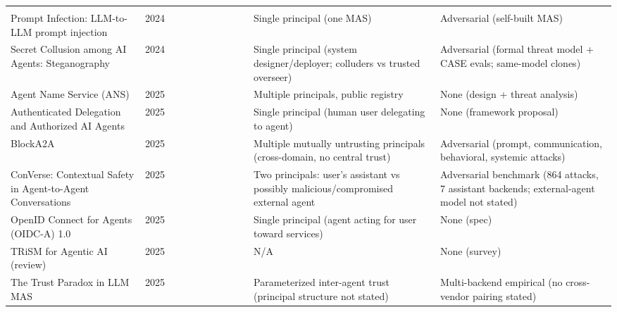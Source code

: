 \documentclass[conference]{IEEEtran}
\newcommand{\full}{{\small\CIRCLE}}
\newcommand{\half}{{\small\LEFTcircle}}
\newcommand{\none}{{\small\Circle}}
\begin{document}
{\begin{longtable}{>{\raggedright\arraybackslash}p{4.2cm} c cccccccc >{\raggedright\arraybackslash}p{3.6cm} >{\raggedright\arraybackslash}p{4.4cm}}
\multicolumn{12}{l}{\textit{Security/identity/delegation}} \\
Prompt Infection: LLM-to-LLM prompt injection \cite{lee2024prompt} & 2024 & \none{} & \none{} & \none{} & \none{} & \none{} & \none{} & \none{} & \full{} & Single principal (one MAS) & Adversarial (self-built MAS) \\
Secret Collusion among AI Agents: Steganography \cite{motwani2024collusion} & 2024 & \none{} & \none{} & \none{} & \none{} & \none{} & \half{} & \none{} & \full{} & Single principal (system designer/deployer; colluders vs trusted overseer) & Adversarial (formal threat model + CASE evals; same-model clones) \\
Agent Name Service (ANS) \cite{huang2025ans} & 2025 & \half{} & \half{} & \none{} & \none{} & \none{} & \none{} & \none{} & \half{} & Multiple principals, public registry & None (design + threat analysis) \\
Authenticated Delegation and Authorized AI Agents \cite{south2025authenticated} & 2025 & \none{} & \none{} & \none{} & \half{} & \none{} & \none{} & \half{} & \none{} & Single principal (human user delegating to agent) & None (framework proposal) \\
BlockA2A \cite{zou2025blocka2a} & 2025 & \none{} & \half{} & \none{} & \half{} & \none{} & \none{} & \full{} & \full{} & Multiple mutually untrusting principals (cross-domain, no central trust) & Adversarial (prompt, communication, behavioral, systemic attacks) \\
ConVerse: Contextual Safety in Agent-to-Agent Conversations \cite{gomaa2025converse} & 2025 & \none{} & \none{} & \none{} & \none{} & \none{} & \none{} & \none{} & \full{} & Two principals: user's assistant vs possibly malicious/compromised external agent & Adversarial benchmark (864 attacks, 7 assistant backends; external-agent model not stated) \\
OpenID Connect for Agents (OIDC-A) 1.0 \cite{nagabhushanaradhya2025oidca} & 2025 & \none{} & \half{} & \none{} & \half{} & \none{} & \none{} & \half{} & \none{} & Single principal (agent acting for user toward services) & None (spec) \\
TRiSM for Agentic AI (review) \cite{raza2025trism} & 2025 & \none{} & \none{} & \none{} & \none{} & \none{} & \none{} & \half{} & \half{} & N/A & None (survey) \\
The Trust Paradox in LLM MAS \cite{xu2025trust} & 2025 & \none{} & \none{} & \none{} & \half{} & \none{} & \none{} & \none{} & \half{} & Parameterized inter-agent trust (principal structure not stated) & Multi-backend empirical (no cross-vendor pairing stated) \\

\end{longtable}}
\end{document}
